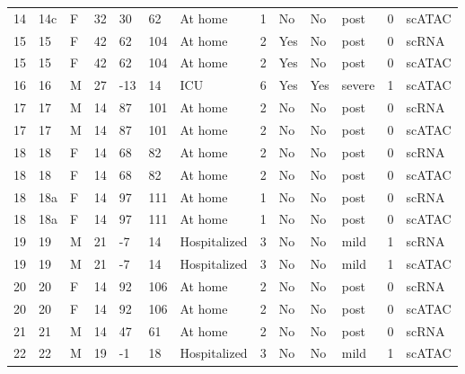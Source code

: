 \documentclass{book}
\begin{document}
\begin{refsection}
\begin{landscape}
\begin{longtable}{p{0.7cm}p{0.7cm}p{0.5cm}p{0.75cm}p{0.75cm}p{0.75cm}p{1.75cm}p{0.8cm}p{0.75cm}p{1cm}p{0.75cm}p{1cm}p{0.75cm}}
    14 & 14c & F & 32 & 30  & 62  & At home                                            & 1 & No  & No  & post   & 0 & scATAC \\
    15 & 15  & F & 42 & 62  & 104 & At home                                            & 2 & Yes & No  & post   & 0 & scRNA \\
    15 & 15  & F & 42 & 62  & 104 & At home                                            & 2 & Yes & No  & post   & 0 & scATAC \\
    16 & 16  & M & 27 & -13 & 14  & ICU                                                & 6 & Yes & Yes & severe & 1 & scATAC \\
    17 & 17  & M & 14 & 87  & 101 & At home                                            & 2 & No  & No  & post   & 0 & scRNA \\
    17 & 17  & M & 14 & 87  & 101 & At home                                            & 2 & No  & No  & post   & 0 & scATAC \\
    18 & 18  & F & 14 & 68  & 82  & At home                                            & 2 & No  & No  & post   & 0 & scRNA \\
    18 & 18  & F & 14 & 68  & 82  & At home                                            & 2 & No  & No  & post   & 0 & scATAC \\
    18 & 18a & F & 14 & 97  & 111 & At home                                            & 1 & No  & No  & post   & 0 & scRNA \\
    18 & 18a & F & 14 & 97  & 111 & At home                                            & 1 & No  & No  & post   & 0 & scATAC \\
    19 & 19  & M & 21 & -7  & 14  & Hospitalized                                       & 3 & No  & No  & mild   & 1 & scRNA \\
    19 & 19  & M & 21 & -7  & 14  & Hospitalized                                       & 3 & No  & No  & mild   & 1 & scATAC \\
    20 & 20  & F & 14 & 92  & 106 & At home                                            & 2 & No  & No  & post   & 0 & scRNA \\
    20 & 20  & F & 14 & 92  & 106 & At home                                            & 2 & No  & No  & post   & 0 & scATAC \\
    21 & 21  & M & 14 & 47  & 61  & At home                                            & 2 & No  & No  & post   & 0 & scRNA \\
    22 & 22  & M & 19 & -1  & 18  & Hospitalized                                       & 3 & No  & No  & mild   & 1 & scATAC \\

\end{longtable}
\end{landscape}
\end{refsection}
\end{document}

